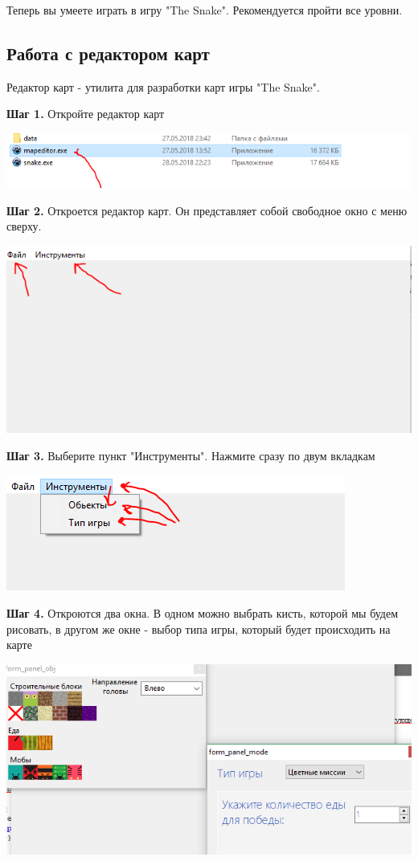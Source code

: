 \documentclass[a4paper,14pt]{extarticle}
\begin{document}
Теперь вы умеете играть в игру "The Snake". Рекомендуется пройти все уровни.
\subsection{Работа с редактором карт}
Редактор карт - утилита для разработки карт игры "The Snake".

\textbf{Шаг 1.} Откройте редактор карт
\begin{center}
\includegraphics[scale=.9]{img12}
\end{center}

\textbf{Шаг 2.} Откроется редактор карт. Он представляет собой свободное окно с меню сверху. 
\begin{center}
\includegraphics[scale=.9]{img13}
\end{center}

\textbf{Шаг 3.} Выберите пункт "Инструменты". Нажмите сразу по двум вкладкам
\begin{center}
\includegraphics[scale=.9]{img14}
\end{center}

\textbf{Шаг 4.} Откроются два окна. В одном можно выбрать кисть, которой мы будем рисовать, в другом же окне - выбор типа игры, который будет происходить на карте
\begin{center}
\includegraphics[scale=.9]{img15}
\end{center}
\end{document}
